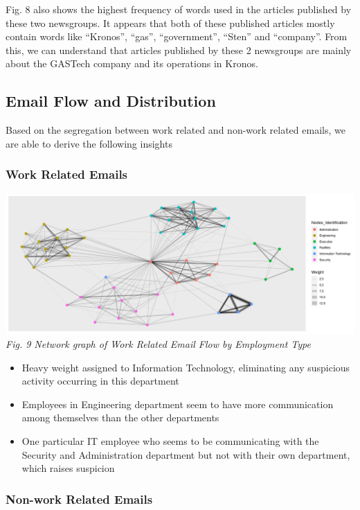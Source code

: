 \documentclass{acm_proc_article-sp}
\providecommand{\tightlist}{%
  \setlength{\itemsep}{0pt}\setlength{\parskip}{0pt}}
\begin{document}
Fig. 8 also shows the highest frequency of words used in the articles
published by these two newsgroups. It appears that both of these
published articles mostly contain words like ``Kronos'', ``gas'',
``government'', ``Sten'' and ``company''. From this, we can understand
that articles published by these 2 newsgroups are mainly about the
GASTech company and its operations in Kronos.

\hypertarget{email-flow-and-distribution}{%
\subsection{Email Flow and
Distribution}\label{email-flow-and-distribution}}

Based on the segregation between work related and non-work related
emails, we are able to derive the following insights

\hypertarget{work-related-emails}{%
\subsubsection{Work Related Emails}\label{work-related-emails}}

\includegraphics{img/image14.png} \emph{Fig. 9 Network graph of Work
Related Email Flow by Employment Type}

\begin{itemize}
\tightlist
\item
  Heavy weight assigned to Information Technology, eliminating any
  suspicious activity occurring in this department
\item
  Employees in Engineering department seem to have more communication
  among themselves than the other departments
\item
  One particular IT employee who seems to be communicating with the
  Security and Administration department but not with their own
  department, which raises suspicion
\end{itemize}

\hypertarget{non-work-related-emails}{%
\subsubsection{Non-work Related Emails}\label{non-work-related-emails}}
\end{document}
